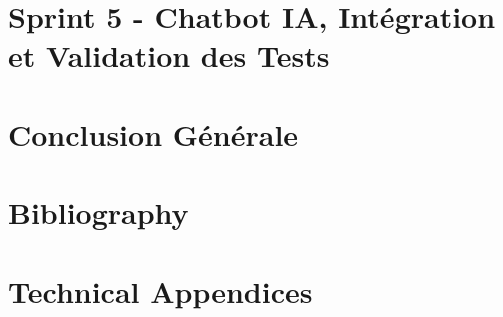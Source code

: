 \documentclass[a4paper,12pt]{report}
\begin{document}
\chapter{Sprint 5 - Chatbot IA, Intégration et Validation des Tests}

\chapter{Conclusion Générale}

\chapter{Bibliography}

\appendix
\chapter{Technical Appendices}
\end{document}
